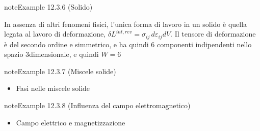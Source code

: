 \documentclass[letterpaper,10pt,italian]{jupyterBook}
\begin{document}
\label{ch/thermodynamics/principles-gibbs-phase-rule:example-9}
\begin{sphinxadmonition}{note}{Example 12.3.6 (Solido)}



\sphinxAtStartPar
In assenza di altri fenomeni fisici, l’unica forma di lavoro in un solido è quella legata al lavoro di deformazione, \(\delta L^{int,rev} = \sigma_{ij} \, d \varepsilon_{ij} dV\). Il tensore di deformazione è del secondo ordine e simmetrico, e ha quindi 6 componenti indipendenti nello spazio 3\sphinxhyphen{}dimensionale, e quindi \(W=6\)
\end{sphinxadmonition}
\label{ch/thermodynamics/principles-gibbs-phase-rule:example-10}
\begin{sphinxadmonition}{note}{Example 12.3.7 (Miscele solide)}


\begin{itemize}
\item {} 
\sphinxAtStartPar
Fasi nelle miscele solide 

\end{itemize}
\end{sphinxadmonition}
\label{ch/thermodynamics/principles-gibbs-phase-rule:example-11}
\begin{sphinxadmonition}{note}{Example 12.3.8 (Influenza del campo elettromagnetico)}


\begin{itemize}
\item {} 
\sphinxAtStartPar
Campo elettrico e magnetizzazione 

\end{itemize}
\end{sphinxadmonition}
\end{document}
